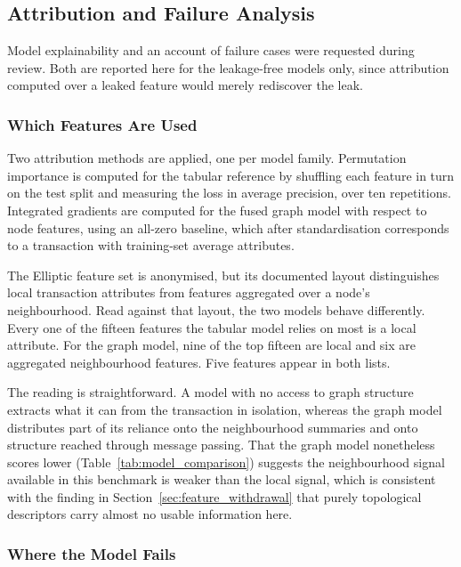 \documentclass[12pt,a4paper]{article}
\begin{document}
\subsection{Attribution and Failure Analysis}
\label{sec:xai}

Model explainability and an account of failure cases were
requested during review. Both are reported here for the
leakage-free models only, since attribution computed over a
leaked feature would merely rediscover the leak.

\subsubsection{Which Features Are Used}

Two attribution methods are applied, one per model family.
Permutation importance is computed for the tabular reference by
shuffling each feature in turn on the test split and measuring
the loss in average precision, over ten repetitions. Integrated
gradients are computed for the fused graph model with respect to
node features, using an all-zero baseline, which after
standardisation corresponds to a transaction with training-set
average attributes.

The Elliptic feature set is anonymised, but its documented layout
distinguishes local transaction attributes from features
aggregated over a node's neighbourhood. Read against that layout,
the two models behave differently. Every one of the fifteen
features the tabular model relies on most is a local attribute.
For the graph model, nine of the top fifteen are local and six
are aggregated neighbourhood features. Five features appear in
both lists.

The reading is straightforward. A model with no access to graph
structure extracts what it can from the transaction in isolation,
whereas the graph model distributes part of its reliance onto the
neighbourhood summaries and onto structure reached through
message passing. That the graph model nonetheless scores lower
(Table~\ref{tab:model_comparison}) suggests the neighbourhood
signal available in this benchmark is weaker than the local
signal, which is consistent with the finding in
Section~\ref{sec:feature_withdrawal} that purely topological
descriptors carry almost no usable information here.

\subsubsection{Where the Model Fails}
\end{document}
